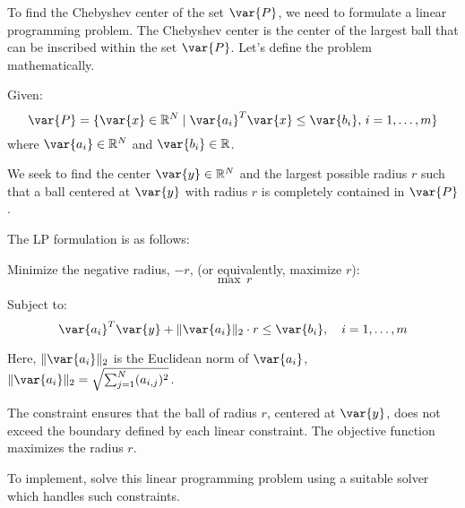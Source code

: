 \documentclass{article}
\begin{document}
To find the Chebyshev center of the set \(\var{P}\), we need to formulate a linear programming problem. The Chebyshev center is the center of the largest ball that can be inscribed within the set \(\var{P}\). Let's define the problem mathematically.

Given:
\[
\var{P} = \{\var{x} \in \mathbb{R}^N \mid \var{a_i}^T \var{x} \leq \var{b_i}, \, i = 1, \ldots, m\}
\]
where \(\var{a_i} \in \mathbb{R}^N\) and \(\var{b_i} \in \mathbb{R}\).

We seek to find the center \(\var{y} \in \mathbb{R}^N\) and the largest possible radius \(r\) such that a ball centered at \(\var{y}\) with radius \(r\) is completely contained in \(\var{P}\).

The LP formulation is as follows:

Minimize the negative radius, \(-r\), (or equivalently, maximize \(r\)):
\[
\max \, r
\]

Subject to:
\[
\var{a_i}^T \var{y} + \| \var{a_i} \|_2 \cdot r \leq \var{b_i}, \quad i = 1, \ldots, m
\]

Here, \(\| \var{a_i} \|_2\) is the Euclidean norm of \(\var{a_i}\), \(\| \var{a_i} \|_2 = \sqrt{\sum_{j=1}^{N} (a_{i,j})^2}\).

The constraint ensures that the ball of radius \(r\), centered at \(\var{y}\), does not exceed the boundary defined by each linear constraint. The objective function maximizes the radius \(r\).

To implement, solve this linear programming problem using a suitable solver which handles such constraints.
\end{document}
